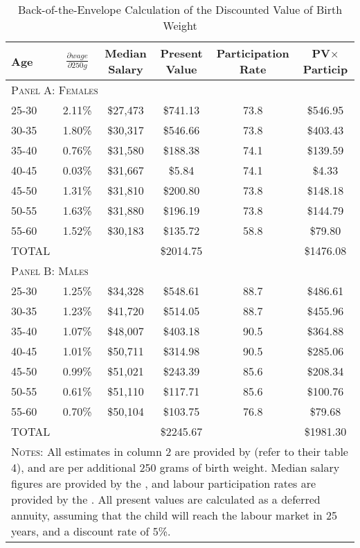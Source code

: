 \documentclass[a4paper, 11pt]{article}
\begin{document}
\begin{table}
  \caption{Back-of-the-Envelope Calculation of the Discounted Value of Birth Weight}
  \label{boeBW}
  \begin{tabular}{lccccc}
    \toprule
    Age & $\frac{\partial wage}{\partial 250g}$ & Median Salary & Present Value & Participation Rate & PV$\times$ Particip \\ \midrule
    \multicolumn{6}{l}{\textsc{Panel A: Females}} \\
    25-30 & 2.11\% & \$27,473  & \$741.13 &73.8&\$546.95 \\
    30-35 & 1.80\% & \$30,317  & \$546.66 &73.8&\$403.43 \\
    35-40 & 0.76\% & \$31,580  & \$188.38 &74.1&\$139.59 \\
    40-45 & 0.03\% & \$31,667  & \$5.84   &74.1&\$4.33   \\
    45-50 & 1.31\% & \$31,810  & \$200.80 &73.8&\$148.18 \\
    50-55 & 1.63\% & \$31,880  & \$196.19 &73.8&\$144.79 \\
    55-60 & 1.52\% & \$30,183  & \$135.72 &58.8&\$79.80  \\ \midrule
    TOTAL &        &           & \$2014.75 &     &\$1476.08\\ \midrule
    \multicolumn{6}{l}{\textsc{Panel B: Males}} \\
    25-30 & 1.25\% & \$34,328 & \$548.61 &  88.7 & \$486.61 \\
    30-35 & 1.23\% & \$41,720  & \$514.05 & 88.7& \$455.96 \\
    35-40 & 1.07\% & \$48,007  & \$403.18 & 90.5& \$364.88 \\
    40-45 & 1.01\% & \$50,711  & \$314.98 & 90.5& \$285.06 \\
    45-50 & 0.99\% & \$51,021  & \$243.39 & 85.6& \$208.34 \\
    50-55 & 0.61\% & \$51,110  & \$117.71 & 85.6& \$100.76 \\
    55-60 & 0.70\% & \$50,104  & \$103.75 & 76.8& \$79.68  \\ \midrule 
    TOTAL &        &           & \$2245.67 &     &\$1981.30 \\ \bottomrule
    \multicolumn{6}{p{14.6cm}}{{\footnotesize \textsc{Notes}:  All estimates
        in column 2 are provided by \citet{Bharadwajetal2015} (refer to their
        table 4), and are per additional 250 grams of birth weight. Median
        salary figures are provided by the \citet{USCB2016},
        and labour participation rates are provided by the \citet{BLS2017}. All
        present values are calculated as a deferred annuity, assuming that
        the child will reach the labour market in 25 years, and a discount
    rate of 5\%.}}
  \end{tabular}
\end{table}
\end{document}
